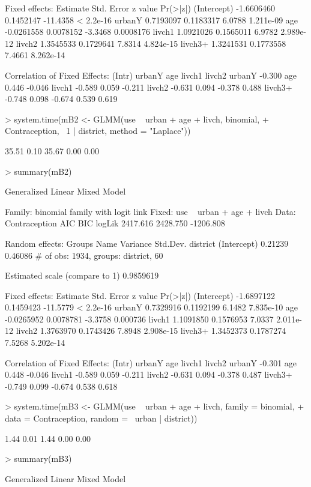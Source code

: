 \documentclass[12pt]{article}
\begin{document}
\begin{Schunk}
\begin{Soutput}
Fixed effects:
              Estimate Std. Error  z value  Pr(>|z|)
(Intercept) -1.6606460  0.1452147 -11.4358 < 2.2e-16
urbanY       0.7193097  0.1183317   6.0788 1.211e-09
age         -0.0261558  0.0078152  -3.3468 0.0008176
livch1       1.0921026  0.1565011   6.9782 2.989e-12
livch2       1.3545533  0.1729641   7.8314 4.824e-15
livch3+      1.3241531  0.1773558   7.4661 8.262e-14

Correlation of Fixed Effects:
        (Intr) urbanY age    livch1 livch2
urbanY  -0.300                            
age      0.446 -0.046                     
livch1  -0.589  0.059 -0.211              
livch2  -0.631  0.094 -0.378  0.488       
livch3+ -0.748  0.098 -0.674  0.539  0.619
\end{Soutput}
\begin{Sinput}
> system.time(mB2 <- GLMM(use ~ urban + age + livch, binomial, 
+     Contraception, ~1 | district, method = "Laplace"))
\end{Sinput}
\begin{Soutput}
[1] 35.51  0.10 35.67  0.00  0.00
\end{Soutput}
\begin{Sinput}
> summary(mB2)
\end{Sinput}
\begin{Soutput}
Generalized Linear Mixed Model

Family: binomial family with logit link
Fixed: use ~ urban + age + livch 
Data: Contraception 
      AIC      BIC    logLik
 2417.616 2428.750 -1206.808

Random effects:
     Groups        Name    Variance    Std.Dev. 
   district (Intercept)     0.21239     0.46086 
# of obs: 1934, groups: district, 60

Estimated scale (compare to 1)  0.9859619 

Fixed effects:
              Estimate Std. Error  z value  Pr(>|z|)
(Intercept) -1.6897122  0.1459423 -11.5779 < 2.2e-16
urbanY       0.7329916  0.1192199   6.1482 7.835e-10
age         -0.0265952  0.0078781  -3.3758  0.000736
livch1       1.1091850  0.1576953   7.0337 2.011e-12
livch2       1.3763970  0.1743426   7.8948 2.908e-15
livch3+      1.3452373  0.1787274   7.5268 5.202e-14

Correlation of Fixed Effects:
        (Intr) urbanY age    livch1 livch2
urbanY  -0.301                            
age      0.448 -0.046                     
livch1  -0.589  0.059 -0.211              
livch2  -0.631  0.094 -0.378  0.487       
livch3+ -0.749  0.099 -0.674  0.538  0.618
\end{Soutput}
\begin{Sinput}
> system.time(mB3 <- GLMM(use ~ urban + age + livch, family = binomial, 
+     data = Contraception, random = ~urban | district))
\end{Sinput}
\begin{Soutput}
[1] 1.44 0.01 1.44 0.00 0.00
\end{Soutput}
\begin{Sinput}
> summary(mB3)
\end{Sinput}
\begin{Soutput}
Generalized Linear Mixed Model


\end{Soutput}
\end{Schunk}
\end{document}
